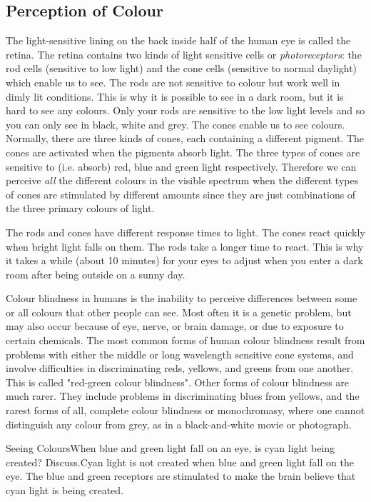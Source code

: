 \subsection{Perception of Colour}
The light-sensitive lining on the back inside half of the human eye is called the retina. 
The retina contains two kinds of light sensitive cells or \textit{photoreceptors}: the rod cells (sensitive to low light) and the cone cells (sensitive to normal daylight) which enable us to see. The rods are not sensitive to colour but work well in dimly lit conditions. This is why it is possible to see in a dark room, but it is hard to see any colours. Only your rods are sensitive to the low light levels and so you can only see in black, white and grey.
The cones enable us to see colours.
Normally, there are three kinds of cones, each containing a different pigment. The cones are activated when the pigments absorb light. 
The three types of cones are sensitive to (i.e. absorb) red, blue and green light respectively. Therefore we can perceive \textit{all} the different colours in the visible spectrum when the different types of cones are stimulated by different amounts since they are just combinations of the three primary colours of light.

The rods and cones have different response times to light. The cones react quickly when bright light falls on them. The rods take a longer time to react. This is why it takes a while (about 10 minutes) for your eyes to adjust when you enter a dark room after being outside on a sunny day. 


\begin{IFact}
{Colour blindness in humans is the inability to perceive differences between some or all colours that other people can see. Most often it is a genetic problem, but may also occur because of eye, nerve, or brain damage, or due to exposure to certain chemicals. The most common forms of human colour blindness result from problems with either the middle or long wavelength sensitive cone systems, and involve difficulties in discriminating reds, yellows, and greens from one another. This is called "red-green colour blindness". Other forms of colour blindness are much rarer. They include problems in discriminating blues from yellows, and the rarest forms of all, complete colour blindness or monochromasy, where one cannot distinguish any colour from grey, as in a black-and-white movie or photograph.}
\end{IFact}
\begin{wex}{Seeing Colours}{When blue and green light fall on an eye, is cyan light being created? Discuss.}{Cyan light is not created when blue and green light fall on the eye. The blue and green receptors are stimulated to make the brain believe that cyan light is being created.}
\end{wex}

